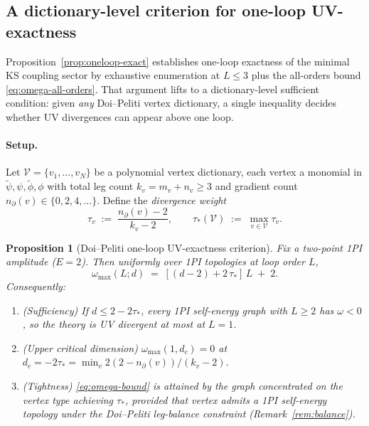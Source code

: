 \documentclass[11pt,a4paper]{article}
\newcommand{\psit}{\tilde\psi}
\newcommand{\phit}{\tilde\phi}
\theoremstyle{plain}
\newtheorem{proposition}[theorem]{Proposition}
\begin{document}
\subsection{A dictionary-level criterion for one-loop UV-exactness}
\label{sec:oneloop-criterion}

Proposition~\ref{prop:oneloop-exact} establishes one-loop
exactness of the minimal KS coupling sector by exhaustive
enumeration at $L \leq 3$ plus the all-orders bound
\eqref{eq:omega-all-orders}.  That argument lifts to a
dictionary-level sufficient condition: given \emph{any}
Doi--Peliti vertex dictionary, a single inequality decides
whether UV divergences can appear above one loop.

\paragraph{Setup.}
Let $\mathcal{V} = \{v_1,\ldots,v_N\}$ be a polynomial vertex
dictionary, each vertex a monomial in $\psit,\psi,\phit,\phi$
with total leg count $k_v = m_v + n_v \geq 3$ and gradient
count $n_\partial(v) \in \{0, 2, 4, \ldots\}$.  Define the
\emph{divergence weight}
\begin{equation}\label{eq:tau-def}
  \tau_v \;:=\; \frac{n_\partial(v) - 2}{k_v - 2},
  \qquad
  \tau_\ast(\mathcal{V}) \;:=\; \max_{v \in \mathcal{V}} \tau_v.
\end{equation}

\begin{proposition}[Doi--Peliti one-loop UV-exactness criterion]
\label{prop:one-loop-criterion}
Fix a two-point 1PI amplitude ($E = 2$).  Then uniformly over
1PI topologies at loop order $L$,
\begin{equation}\label{eq:omega-bound}
  \omega_{\max}(L;d) \;=\; [(d - 2) + 2\,\tau_\ast]\,L \;+\; 2.
\end{equation}
Consequently:
\begin{enumerate}[leftmargin=1.8em,itemsep=-0.2em]
\item \textup{(Sufficiency)} If $d \leq 2 - 2\tau_\ast$, every 1PI
      self-energy graph with $L \geq 2$ has $\omega < 0$, so the
      theory is UV divergent at most at $L = 1$.
\item \textup{(Upper critical dimension)} $\omega_{\max}(1,d_c) = 0$
      at $d_c = -2\tau_\ast = \min_v 2(2-n_\partial(v))/(k_v-2)$.
\item \textup{(Tightness)} \eqref{eq:omega-bound} is attained by
      the graph concentrated on the vertex type achieving
      $\tau_\ast$, provided that vertex admits a 1PI self-energy
      topology under the Doi--Peliti leg-balance constraint
      (Remark~\ref{rem:balance}).
\end{enumerate}
\end{proposition}
\end{document}
